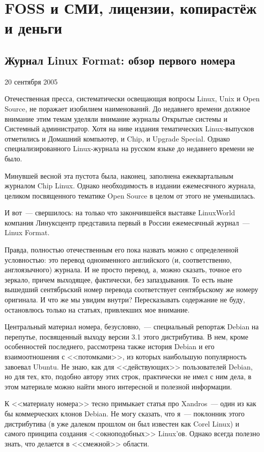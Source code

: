 \chapter{FOSS и СМИ, лицензии, копирастёж и деньги}
\section{Журнал Linux Format: обзор первого номера} 

\begin{timeline}
20 сентября 2005
\end{timeline}
Отечественная пресса, систематически освещающая вопросы Linux, Unix и Open Source, не поражает изобилием наименований. До недавнего времени должное внимание этим темам уделяли внимание журналы Открытые системы и Системный администратор. Хотя на ниве издания тематических Linux-выпусков отметились и Домашний компьютер, и Chip, и Upgrade Special. Однако специализированного Linux-журнала на русском языке до недавнего времени не было.

Минувшей весной эта пустота была, наконец, заполнена ежеквартальным журналом Chip Linux. Однако необходимость в издании ежемесячного журнала, целиком посвященного тематике Open Source в целом от этого не уменьшилась.

И вот~--- свершилось: на только что закончившейся выставке LinuxWorld компания Линуксцентр представила первый в России ежемесячный журнал~--- Linux Format.

Правда, полностью отечественным его пока назвать можно с определенной условностью: это перевод одноименного английского (и, соответственно, англоязычного) журнала. И не просто перевод, а, можно сказать, точное его зеркало, причем выходящее, фактически, без запаздывания. То есть ныне вышедший сентябрьский номер перевода соответствует сентябрьскому же номеру оригинала. И что же мы увидим внутри? Пересказывать содержание не буду, остановлюсь только на статьях, привлекших мое внимание.

Центральный материал номера, безусловно,~--- специальный репортаж Debian на перепутье, посвященный выходу версии 3.1 этого дистрибутива. В нем, кроме особенностей последнего, рассмотрена также история Debian и его взаимоотношения с <<потомками>>, из которых наибольшую популярность завоевал Ubuntu. Не знаю, как для <<действующих>> пользователей Debian, но для тех, кто, подобно автору этих строк, практически не имел с ним дела, в этом материале можно найти много интересной и полезной информации.

К <<материалу номера>> тесно примыкает статья про Xandros~--- один из как бы коммерческих клонов Debian. Не могу сказать, что я~--- поклонник этого дистрибутива (в уже далеком прошлом он был известен как Corel Linux) и самого принципа создания <<окноподобных>> Linux'ов. Однако всегда полезно знать, что делается в <<смежной>> области.

